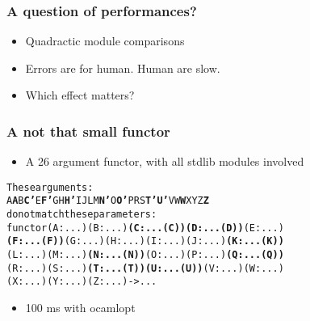 \documentclass[a4paper,11pt]{beamer}
\begin{document}
\begin{frame}[fragile] \frametitle{A question of performances?}
  \begin{itemize}
    \item{Quadractic module comparisons}
    \item{Errors are for human. Human are slow.}
    \item{Which effect matters?}
  \end{itemize}
\end{frame}

\begin{frame}[fragile]\frametitle{A not that small functor}
  \begin{itemize}
    \item A 26 argument functor, with all stdlib modules involved
  \end{itemize}
\begin{alltt}
These arguments:
  {\color{green}{}A} {\color{red}{}\bfseries{}A} {\color{green}{}B} {\color{magenta}{}\bfseries{}C'} {\color{red}{}\bfseries{}} {\color{green}{}E} {\color{magenta}{}\bfseries{}F'} {\color{green}{}G} {\color{green}{}H} {\color{red}{}\bfseries{}H'} {\color{green}{}I} {\color{green}{}J} {\color{red}{}\bfseries{}} {\color{green}{}L} {\color{green}{}M} {\color{magenta}{}\bfseries{}N'} {\color{green}{}O} {\color{red}{}\bfseries{}O'} {\color{green}{}P} {\color{red}{}\bfseries{}} {\color{green}{}R} {\color{green}{}S} {\color{magenta}{}\bfseries{}T'} {\color{magenta}{}\bfseries{}U'} {\color{green}{}V} {\color{green}{}W} {\color{red}{}\bfseries{}W} {\color{green}{}X} {\color{green}{}Y} {\color{green}{}Z} {\color{red}{}\bfseries{}Z}
do not match these parameters:
  functor {\color{green}{}(A : ...)} {\color{red}{}\bfseries{}} {\color{green}{}(B : ...)} {\color{magenta}{}\bfseries{}(C : ...(C))} {\color{red}{}\bfseries{}(D : ...(D))} {\color{green}{}(E : ...)}
  {\color{magenta}{}\bfseries{}(F : ...(F))} {\color{green}{}(G : ...)} {\color{green}{}(H : ...)} {\color{red}{}\bfseries{}} {\color{green}{}(I : ...)} {\color{green}{}(J : ...)} {\color{red}{}\bfseries{}(K : ...(K))}
  {\color{green}{}(L : ...)} {\color{green}{}(M : ...)} {\color{magenta}{}\bfseries{}(N : ...(N))} {\color{green}{}(O : ...)} {\color{red}{}\bfseries{}} {\color{green}{}(P : ...)} {\color{red}{}\bfseries{}(Q : ...(Q))}
  {\color{green}{}(R : ...)} {\color{green}{}(S : ...)} {\color{magenta}{}\bfseries{}(T : ...(T))} {\color{magenta}{}\bfseries{}(U : ...(U))} {\color{green}{}(V : ...)} {\color{green}{}(W : ...)} {\color{red}{}\bfseries{}}
  {\color{green}{}(X : ...)} {\color{green}{}(Y : ...)} {\color{green}{}(Z : ...)} {\color{red}{}\bfseries{}} -> ...
\end{alltt}

  \begin{itemize}
    \item 100 ms with ocamlopt
  \end{itemize}

\end{frame}
\end{document}

